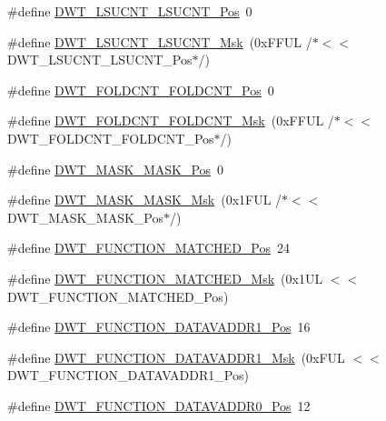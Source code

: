\begin{DoxyCompactItemize}
\item 
\#define \hyperlink{group___c_m_s_i_s___d_w_t_gab9394c7911b0b4312a096dad91d53a3d}{D\+W\+T\+\_\+\+L\+S\+U\+C\+N\+T\+\_\+\+L\+S\+U\+C\+N\+T\+\_\+\+Pos}~0
\item 
\#define \hyperlink{group___c_m_s_i_s___d_w_t_ga2186d7fc9317e20bad61336ee2925615}{D\+W\+T\+\_\+\+L\+S\+U\+C\+N\+T\+\_\+\+L\+S\+U\+C\+N\+T\+\_\+\+Msk}~(0x\+F\+F\+U\+L /$\ast$$<$$<$ D\+W\+T\+\_\+\+L\+S\+U\+C\+N\+T\+\_\+\+L\+S\+U\+C\+N\+T\+\_\+\+Pos$\ast$/)
\item 
\#define \hyperlink{group___c_m_s_i_s___d_w_t_ga7f8af5ac12d178ba31a516f6ed141455}{D\+W\+T\+\_\+\+F\+O\+L\+D\+C\+N\+T\+\_\+\+F\+O\+L\+D\+C\+N\+T\+\_\+\+Pos}~0
\item 
\#define \hyperlink{group___c_m_s_i_s___d_w_t_ga9cb73d0342d38b14e41027d3c5c02647}{D\+W\+T\+\_\+\+F\+O\+L\+D\+C\+N\+T\+\_\+\+F\+O\+L\+D\+C\+N\+T\+\_\+\+Msk}~(0x\+F\+F\+U\+L /$\ast$$<$$<$ D\+W\+T\+\_\+\+F\+O\+L\+D\+C\+N\+T\+\_\+\+F\+O\+L\+D\+C\+N\+T\+\_\+\+Pos$\ast$/)
\item 
\#define \hyperlink{group___c_m_s_i_s___d_w_t_gaf798ae34e2b9280ea64f4d9920cd2e7d}{D\+W\+T\+\_\+\+M\+A\+S\+K\+\_\+\+M\+A\+S\+K\+\_\+\+Pos}~0
\item 
\#define \hyperlink{group___c_m_s_i_s___d_w_t_gadd798deb0f1312feab4fb05dcddc229b}{D\+W\+T\+\_\+\+M\+A\+S\+K\+\_\+\+M\+A\+S\+K\+\_\+\+Msk}~(0x1\+F\+U\+L /$\ast$$<$$<$ D\+W\+T\+\_\+\+M\+A\+S\+K\+\_\+\+M\+A\+S\+K\+\_\+\+Pos$\ast$/)
\item 
\#define \hyperlink{group___c_m_s_i_s___d_w_t_ga22c5787493f74a6bacf6ffb103a190ba}{D\+W\+T\+\_\+\+F\+U\+N\+C\+T\+I\+O\+N\+\_\+\+M\+A\+T\+C\+H\+E\+D\+\_\+\+Pos}~24
\item 
\#define \hyperlink{group___c_m_s_i_s___d_w_t_gac8b1a655947490280709037808eec8ac}{D\+W\+T\+\_\+\+F\+U\+N\+C\+T\+I\+O\+N\+\_\+\+M\+A\+T\+C\+H\+E\+D\+\_\+\+Msk}~(0x1\+U\+L $<$$<$ D\+W\+T\+\_\+\+F\+U\+N\+C\+T\+I\+O\+N\+\_\+\+M\+A\+T\+C\+H\+E\+D\+\_\+\+Pos)
\item 
\#define \hyperlink{group___c_m_s_i_s___d_w_t_ga8b75e8ab3ffd5ea2fa762d028dc30e8c}{D\+W\+T\+\_\+\+F\+U\+N\+C\+T\+I\+O\+N\+\_\+\+D\+A\+T\+A\+V\+A\+D\+D\+R1\+\_\+\+Pos}~16
\item 
\#define \hyperlink{group___c_m_s_i_s___d_w_t_gafdbf5a8c367befe8661a4f6945c83445}{D\+W\+T\+\_\+\+F\+U\+N\+C\+T\+I\+O\+N\+\_\+\+D\+A\+T\+A\+V\+A\+D\+D\+R1\+\_\+\+Msk}~(0x\+F\+U\+L $<$$<$ D\+W\+T\+\_\+\+F\+U\+N\+C\+T\+I\+O\+N\+\_\+\+D\+A\+T\+A\+V\+A\+D\+D\+R1\+\_\+\+Pos)
\item 
\#define \hyperlink{group___c_m_s_i_s___d_w_t_ga9854cd8bf16f7dce0fb196a8029b018e}{D\+W\+T\+\_\+\+F\+U\+N\+C\+T\+I\+O\+N\+\_\+\+D\+A\+T\+A\+V\+A\+D\+D\+R0\+\_\+\+Pos}~12

\end{DoxyCompactItemize}
